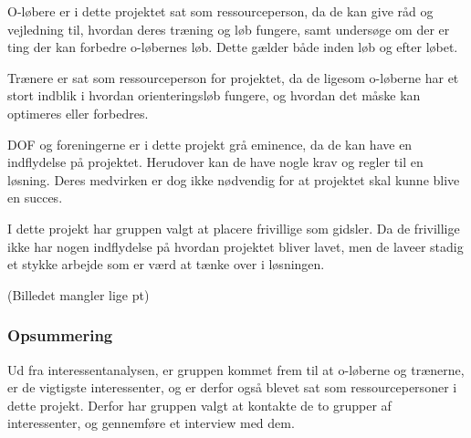 O-løbere er i dette projektet sat som ressourceperson, da de kan give råd og vejledning til, hvordan deres træning og løb fungere, samt undersøge om der er ting der kan forbedre o-løbernes løb. Dette gælder både inden løb og efter løbet.

Trænere er sat som ressourceperson for projektet, da de ligesom o-løberne har et stort indblik i hvordan orienteringsløb fungere, og hvordan det måske kan optimeres eller forbedres. 

DOF og foreningerne er i dette projekt grå eminence, da de kan have en indflydelse på projektet. Herudover kan de have nogle krav og regler til en løsning. Deres medvirken er dog ikke nødvendig for at projektet skal kunne blive en succes.

I dette projekt har gruppen valgt at placere frivillige som gidsler. Da de frivillige ikke har nogen indflydelse på hvordan projektet bliver lavet, men de laveer stadig et stykke arbejde som er værd at tænke over i løsningen.    


(Billedet mangler lige pt)



\subsubsection{Opsummering}
Ud fra interessentanalysen, er gruppen kommet frem til at o-løberne og trænerne, er de vigtigste interessenter, og er derfor også blevet sat som ressourcepersoner i dette projekt. Derfor har gruppen valgt at kontakte de to grupper af interessenter, og gennemføre et interview med dem. 
